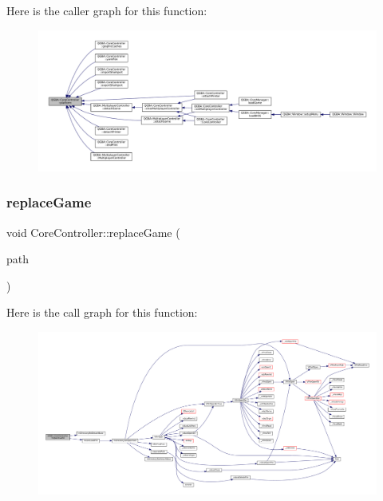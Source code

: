 Here is the caller graph for this function\+:
\nopagebreak
\begin{figure}[H]
\begin{center}
\leavevmode
\includegraphics[width=350pt]{class_q_g_b_a_1_1_core_controller_a340f633528b35be81f7803c78dfd63d4_icgraph}
\end{center}
\end{figure}
\mbox{\label{class_q_g_b_a_1_1_core_controller_a132edaa3596891696512074c6f6bff70}} 
\subsubsection{\texorpdfstring{replace\+Game}{replaceGame}}
{\footnotesize\ttfamily void Core\+Controller\+::replace\+Game (\begin{DoxyParamCaption}\item[{const Q\+String \&}]{path }\end{DoxyParamCaption})\hspace{0.3cm}{\ttfamily [slot]}}

Here is the call graph for this function\+:
\nopagebreak
\begin{figure}[H]
\begin{center}
\leavevmode
\includegraphics[width=350pt]{class_q_g_b_a_1_1_core_controller_a132edaa3596891696512074c6f6bff70_cgraph}
\end{center}
\end{figure}
\mbox{\label{class_q_g_b_a_1_1_core_controller_a6d73ddd320e162098eac86601f699cd7}} 
